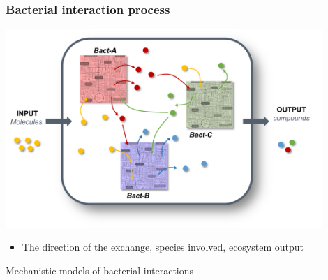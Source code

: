 \documentclass[8pt,usenames,dvipsnames]{beamer}
\begin{document}
\begin{frame}
\frametitle{Bacterial interaction process}
\centering
\includegraphics[width=0.9\textwidth]{figures/interactions.pdf}
\begin{itemize}
\item The direction of the exchange, species involved, ecosystem output
\end{itemize}

\begin{alertblock}{}
\centering
Mechanistic models of bacterial interactions
\end{alertblock}
\end{frame}

%
%
\end{document}
